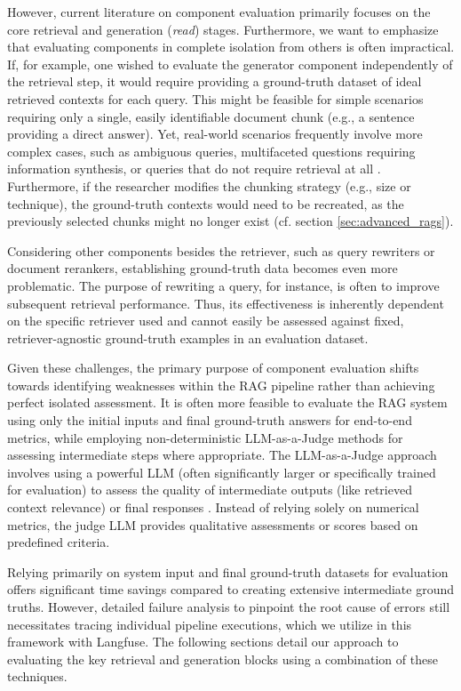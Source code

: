 However, current literature on component evaluation primarily focuses on the core retrieval and generation (\textit{read}) stages. Furthermore, we want to emphasize that evaluating components in complete isolation from others is often impractical. If, for example, one wished to evaluate the generator component independently of the retrieval step, it would require providing a ground-truth dataset of ideal retrieved contexts for each query. This might be feasible for simple scenarios requiring only a single, easily identifiable document chunk (e.g., a sentence providing a direct answer). Yet, real-world scenarios frequently involve more complex cases, such as ambiguous queries, multifaceted questions requiring information synthesis, or queries that do not require retrieval at all \cite{Huang.2023}. Furthermore, if the researcher modifies the chunking strategy (e.g., size or technique), the ground-truth contexts would need to be recreated, as the previously selected chunks might no longer exist (cf. section \ref{sec:advanced_rags}).

Considering other components besides the retriever, such as query rewriters or document rerankers, establishing ground-truth data becomes even more problematic. The purpose of rewriting a query, for instance, is often to improve subsequent retrieval performance. Thus, its effectiveness is inherently dependent on the specific retriever used and cannot easily be assessed against fixed, retriever-agnostic ground-truth examples in an evaluation dataset.

Given these challenges, the primary purpose of component evaluation shifts towards identifying weaknesses within the RAG pipeline rather than achieving perfect isolated assessment. It is often more feasible to evaluate the RAG system using only the initial inputs and final ground-truth answers for end-to-end metrics, while employing non-deterministic LLM-as-a-Judge methods for assessing intermediate steps where appropriate. The LLM-as-a-Judge approach involves using a powerful LLM (often significantly larger or specifically trained for evaluation) to assess the quality of intermediate outputs (like retrieved context relevance) or final responses \cite{Chiang.2023}. Instead of relying solely on numerical metrics, the judge LLM provides qualitative assessments or scores based on predefined criteria.

Relying primarily on system input and final ground-truth datasets for evaluation offers significant time savings compared to creating extensive intermediate ground truths. However, detailed failure analysis to pinpoint the root cause of errors still necessitates tracing individual pipeline executions, which we utilize in this framework with Langfuse. The following sections detail our approach to evaluating the key retrieval and generation blocks using a combination of these techniques.

